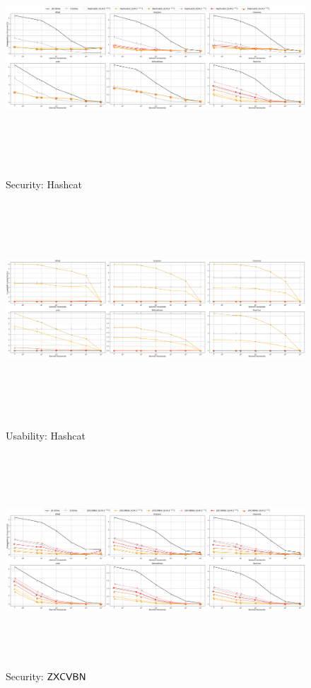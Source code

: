 \begin{figure}
				\includegraphics[width=\linewidth, height = 8cm]{Figures/Experiments/Attacker/SecurityHashcat}
	\vspace{-0.2in}
	\caption[Security: Hashcat Estimator]{Security: Hashcat}
	\label{fig:securityhashcat}
			\includegraphics[width=\linewidth, height = 8cm]{Figures/Experiments/Utility/UsabilityHashcat}
\vspace{-0.2in}
\caption[Usability: Hashcat Estimator]{Usability: Hashcat}
\label{fig:usabilityhashcat}
	\includegraphics[width=\linewidth, height = 8cm]{Figures/Experiments/Attacker/SecurityZxcvbn}
	\vspace{-0.2in}
	\caption[Security: $\ZXCVBN$ Estimator]{Security: $\ZXCVBN$}
	\label{fig:securityzxcvbn}
\end{figure}





